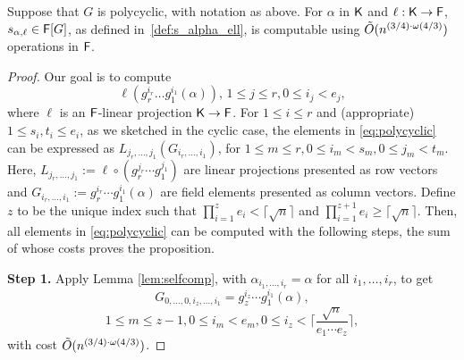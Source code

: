 \begin{proposition}\label{prop:polycyclic}
  Suppose that $G$ is polycyclic, with notation as above. For $\alpha$ in
  ${\mathsf{K}}$ and $\ell:{\mathsf{K}}\to{\mathsf{F}}$, $s_{\alpha,\ell} \in {\mathsf{F}}[G]$, as defined
  in~\eqref{def:s_alpha_ell}, is computable using $\tilde{O}(n^{(3/4)\cdot \omega(4/3)})$
  operations in ${\mathsf{F}}$.
\end{proposition}
\begin{proof}
Our goal is to compute
\begin{equation} \label{eq:polycyclic}
  \ell (g_r^{i_r}  \ldots g_1^{i_1}(\alpha)), \, 1 \leq j \leq r, 0 \leq i_j < e_j,
\end{equation}
where $\ell$ is an ${\mathsf{F}}$-linear projection ${\mathsf{K}}\to {\mathsf{F}}$.  For $ 1\leq i
\leq r$ and (appropriate) $1 \leq s_i, t_i \leq e_i$, as we sketched in the
cyclic case, the elements in \eqref{eq:polycyclic} can be expressed as
$L_{j_r,\dots, j_1} (G_{i_r,\dots,i_1})$, 
for $1\leq m \leq r, 0\leq i_m < s_m, 0 \leq j_m < t_m$.
Here, $L_{j_r,\dots,j_1} :=\ell \circ (g_r^{j_r} \cdots
g_1^{j_1})$ are linear projections presented as row vectors and
$G_{i_r,\dots,i_1}:=g_r^{i_r} \cdots g_1^{i_1}(\alpha)$ are field
elements presented as column vectors. Define $z$ to be the unique index such that 
$\prod_{i = 1}^{z} e_i < \lceil \sqrt{n} \rceil$ and 
$\prod_{i = 1}^{z+1} e_i \geq \lceil \sqrt{n} \rceil.$ 
Then, all elements in
\eqref{eq:polycyclic} can be computed with the following steps, the sum of whose 
costs proves the proposition.

\smallskip\noindent \textbf{Step 1.} Apply Lemma \ref{lem:selfcomp},
with $\alpha_{i_1,\dots,i_r} = \alpha$ for all $i_1,\dots,i_r$, to get
$$
G_{0, \ldots, 0,i_z,\dots,i_1}=g_z^{i_z} \cdots g_1^{i_1}(\alpha),$$
$$
 1\leq m \leq z-1, 0\leq i_m < e_m,
0\leq i_z < \Big\lceil \frac{\sqrt{n}}{e_1 \cdots e_z} \Big\rceil,
$$
with cost $\tilde{O}(n^{(3/4)\cdot \omega(4/3)})$.


\end{proof}
